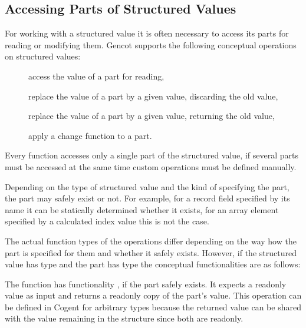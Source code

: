 \subsection{Accessing Parts of Structured Values}
\label{design-operations-parts}

For working with a structured value it is often necessary to access its parts for reading or modifying them.
Gencot supports the following conceptual operations on structured values:
\begin{description}
  \item[] access the value of a part for reading,
  \item[] replace the value of a part by a given value, discarding the old value,
  \item[] replace the value of a part by a given value, returning the old value,
  \item[] apply a change function to a part.
\end{description}

Every function accesses only a single part of the structured value, if several parts must be accessed at the same
time custom operations must be defined manually.

Depending on the type of structured value and the kind of specifying the part, the part may safely exist or not.
For example, for a record field specified by its name it can be statically determined whether it exists,
for an array element specified by a calculated index value this is not the case. 

The actual function types of the operations differ depending on the way how the part is specified for them and
whether it safely exists. However, if the structured value has type  and the part has type  
the conceptual functionalities are as follows:

The function  has functionality , if the part safely exists. It expects a readonly value as input and returns
a readonly copy of the part's value. This operation can be defined in Cogent for arbitrary types 
because the returned value can be shared with the value remaining in the structure since both are readonly.

